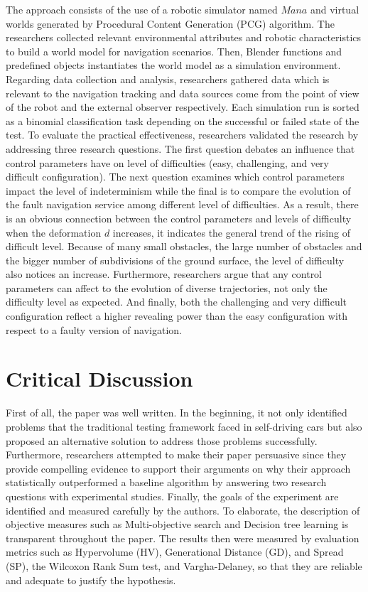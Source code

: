 \documentclass[10pt,a4paper]{report}
\begin{document}
The approach consists of the use of a robotic simulator named $Mana$ and virtual worlds generated by Procedural Content Generation (PCG) algorithm. 
%
The researchers collected relevant environmental attributes and robotic characteristics to build a world model for navigation scenarios.
%
Then, Blender functions and predefined objects instantiates the world model as a simulation environment.
%
Regarding data collection and analysis, researchers gathered data which is relevant to the navigation tracking and data sources come from the point of view of the robot and the external observer respectively.
%
Each simulation run is sorted as a binomial classification task depending on the successful or failed state of the test.
%
To evaluate the practical effectiveness, researchers validated the research by addressing three research questions.
%
The first question debates an influence that control parameters have on level of difficulties (easy, challenging, and very difficult configuration).
%
The next question examines which control parameters impact the level of indeterminism while the final is to compare the evolution of the fault navigation service among different level of difficulties.
%
As a result, there is an obvious connection between the control parameters and levels of difficulty when the deformation $d$ increases, it indicates the general trend of the rising of difficult level.
%
Because of many small obstacles, the large number of obstacles and the bigger number of subdivisions of the ground surface, the level of difficulty also notices an increase.
%
Furthermore, researchers argue that any control parameters can affect to the evolution of diverse trajectories, not only the difficulty level as expected.
%
And finally, both the challenging and very difficult configuration reflect a higher revealing power than the easy configuration with respect to a faulty version of navigation.



\section{Critical Discussion}
First of all, the paper was well written. In the beginning, it not only identified problems that the traditional testing framework faced in self-driving cars but also proposed an alternative solution to address those problems successfully.
%
Furthermore, researchers attempted to make their paper persuasive since they provide compelling evidence to support their arguments on why their approach statistically outperformed a baseline algorithm by answering two research questions with experimental studies.  
%
Finally, the goals of the experiment are identified and measured carefully by the authors.
%
To elaborate, the description of objective measures such as Multi-objective search and Decision tree learning is transparent throughout the paper. 
%
The results then were measured by evaluation metrics such as Hypervolume (HV), Generational Distance (GD), and Spread (SP), the Wilcoxon Rank Sum test, and Vargha-Delaney, so that they are reliable and adequate to justify the hypothesis.
%
\end{document}
